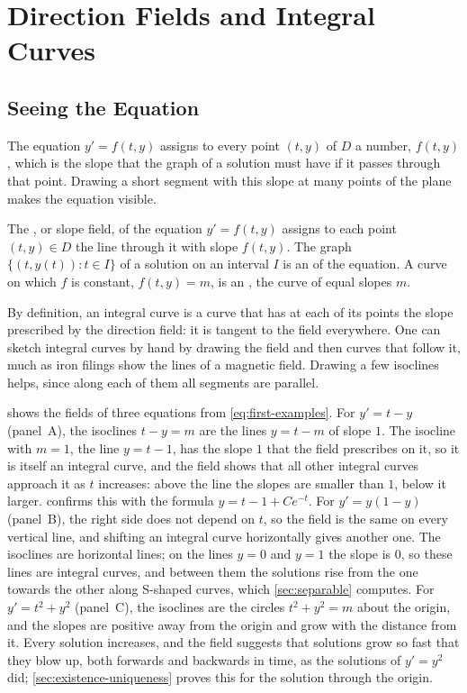 \section{Direction Fields and Integral Curves}
\label{sec:direction-fields}

\subsection{Seeing the Equation}

The equation $y'=f(t,y)$ assigns to every point $(t,y)$ of $D$ a number, $f(t,y)$, which is the slope that the graph of a solution must have if it passes through that point. Drawing a short segment with this slope at many points of the plane makes the equation visible.

\begin{definition}
\label{def:direction-field}
The , or slope field, of the equation $y'=f(t,y)$ assigns to each point $(t,y)\in D$ the line through it with slope $f(t,y)$. The graph $\{(t,y(t)):t\in I\}$ of a solution on an interval $I$ is an  of the equation. A curve on which $f$ is constant, $f(t,y)=m$, is an , the curve of equal slopes $m$.
\end{definition}

By definition, an integral curve is a curve that has at each of its points the slope prescribed by the direction field: it is tangent to the field everywhere. One can sketch integral curves by hand by drawing the field and then curves that follow it, much as iron filings show the lines of a magnetic field. Drawing a few isoclines helps, since along each of them all segments are parallel.

 shows the fields of three equations from \eqref{eq:first-examples}. For $y'=t-y$ (panel~A), the isoclines $t-y=m$ are the lines $y=t-m$ of slope $1$. The isocline with $m=1$, the line $y=t-1$, has the slope $1$ that the field prescribes on it, so it is itself an integral curve, and the field shows that all other integral curves approach it as $t$ increases: above the line the slopes are smaller than $1$, below it larger.  confirms this with the formula $y=t-1+Ce^{-t}$. For $y'=y(1-y)$ (panel~B), the right side does not depend on $t$, so the field is the same on every vertical line, and shifting an integral curve horizontally gives another one. The isoclines are horizontal lines; on the lines $y=0$ and $y=1$ the slope is $0$, so these lines are integral curves, and between them the solutions rise from the one towards the other along S-shaped curves, which \cref{sec:separable} computes. For $y'=t^2+y^2$ (panel~C), the isoclines are the circles $t^2+y^2=m$ about the origin, and the slopes are positive away from the origin and grow with the distance from it. Every solution increases, and the field suggests that solutions grow so fast that they blow up, both forwards and backwards in time, as the solutions of $y'=y^2$ did; \cref{sec:existence-uniqueness} proves this for the solution through the origin.


